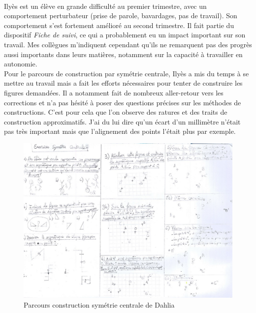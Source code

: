 \paragraph{}Ilyès est un élève en grande difficulté au premier trimestre, avec un comportement perturbateur (prise de parole, bavardages, pas de travail). Son comportement s'est fortement amélioré au second trimestre. Il fait partie du dispositif \textit{Fiche de suivi}, ce qui a probablement eu un impact important sur son travail. Mes collègues m'indiquent cependant qu'ils ne remarquent pas des progrès aussi importants dans leurs matières, notamment sur la capacité à travailler en autonomie.\\
Pour le parcours de construction par symétrie centrale, Ilyès a mis du temps à se mettre au travail mais a fait les efforts nécessaires pour tenter de construire les figures demandées. Il a notamment fait de nombreux aller-retour vers les corrections et n'a pas hésité à poser des questions précises sur les méthodes de constructions. C'est pour cela que l'on observe des ratures et des traits de construction approximatifs. J'ai du lui dire qu'un écart d'un millimètre n'était pas très important mais que l'alignement des points l'était plus par exemple. 
\begin{figure}[!h]
	\centering
	\includegraphics[scale=0.4]{img/symetrie_Dahlia.jpg}
	\caption{Parcours construction symétrie centrale de Dahlia}
\end{figure}
